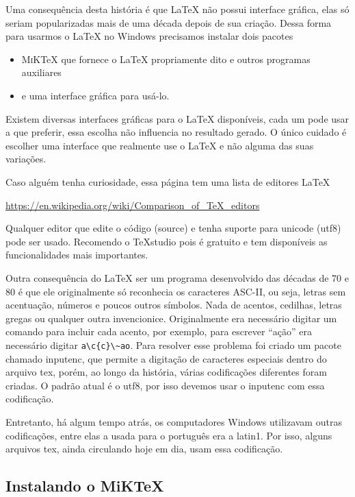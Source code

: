 \documentclass[fleqn]{profmat-cefet}
\newcommand{\MiKTeX}   {\textsc{MiK}\TeX}
\newcommand{\TeXstudio}{\TeX\textsf{studio}}
\begin{document}
Uma consequência desta história é que \LaTeX{} não possui interface gráfica,
elas só seriam popularizadas mais de uma década depois de sua criação. Dessa
forma para usarmos o \LaTeX{} no Windows precisamos instalar dois pacotes
\begin{itemize}
    \item \MiKTeX{} que fornece o \LaTeX{} propriamente dito e outros 
    programas auxiliares
    \item e uma interface gráfica para usá-lo.
\end{itemize} 
Existem diversas interfaces gráficas para o \LaTeX{} disponíveis, cada um pode
usar a que preferir, essa escolha não influencia no resultado gerado.  O único
cuidado é escolher uma interface que realmente use o \LaTeX{} e não alguma das
suas variações.

Caso alguém tenha curiosidade, essa página tem uma lista de editores \LaTeX{}
\begin{center}
    \url{https://en.wikipedia.org/wiki/Comparison\_of\_TeX\_editors}
\end{center}
Qualquer editor que edite o código (source) e tenha suporte para unicode
(\textsf{utf8}) pode ser usado. Recomendo o \TeXstudio{} pois é gratuito e tem
disponíveis as funcionalidades mais importantes.

Outra consequência do \LaTeX{} ser um programa desenvolvido das décadas de 70 e
80 é que ele originalmente só reconhecia os caracteres \textsf{ASC-II}, ou seja,
letras sem acentuação, números e poucos outros símbolos. Nada de acentos,
cedilhas, letras gregas ou qualquer outra invencionice. Originalmente era
necessário digitar um comando para incluir cada acento, por exemplo, para
escrever ``ação'' era necessário digitar \lstinline!a\c{c}\~ao!. Para resolver
esse problema foi criado um pacote chamado \textsf{inputenc}, que permite a
digitação de caracteres especiais dentro do arquivo \textsf{tex}, porém, ao
longo da história, várias codificações diferentes foram criadas. O padrão atual
é o \textsf{utf8}, por isso devemos usar o \textsf{inputenc} com essa
codificação.

Entretanto, há algum tempo atrás, os computadores Windows utilizavam outras
codificações, entre elas a usada para o português era a \textsf{latin1}. Por
isso, alguns arquivos \textsf{tex}, ainda circulando hoje em dia, usam essa
codificação. 

\subsection{Instalando o \textsf{MiKTeX}}
\end{document}
